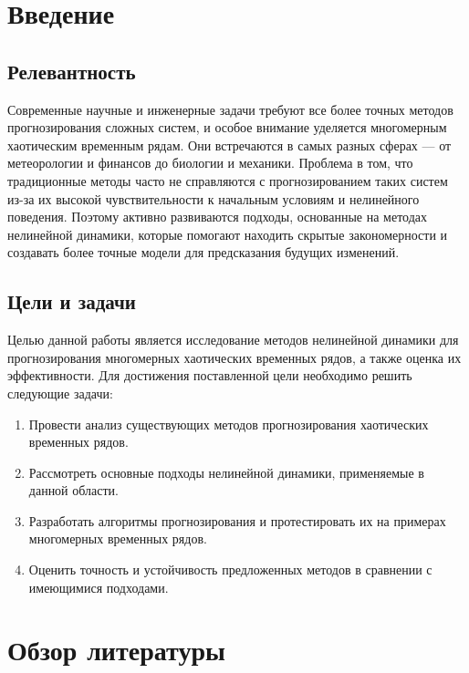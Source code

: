 \documentclass[a4paper, 12pt]{extarticle}
\begin{document}
\section{Введение}

\subsection{Релевантность}
Современные научные и инженерные задачи требуют все более точных методов прогнозирования сложных систем, и особое внимание уделяется многомерным хаотическим временным рядам. Они встречаются в самых разных сферах — от метеорологии и финансов до биологии и механики. Проблема в том, что традиционные методы часто не справляются с прогнозированием таких систем из-за их высокой чувствительности к начальным условиям и нелинейного поведения. Поэтому активно развиваются подходы, основанные на методах нелинейной динамики, которые помогают находить скрытые закономерности и создавать более точные модели для предсказания будущих изменений.

\subsection{Цели и задачи}
Целью данной работы является исследование методов нелинейной динамики для прогнозирования многомерных хаотических временных рядов, а также оценка их эффективности.
Для достижения поставленной цели необходимо решить следующие задачи:
\begin{enumerate}

\item Провести анализ существующих методов прогнозирования хаотических временных рядов.

\item Рассмотреть основные подходы нелинейной динамики, применяемые в данной области.

\item Разработать алгоритмы прогнозирования и протестировать их на примерах многомерных временных рядов.

\item Оценить точность и устойчивость предложенных методов в сравнении с имеющимися подходами.

\end{enumerate}

\section{Обзор литературы}
\end{document}

